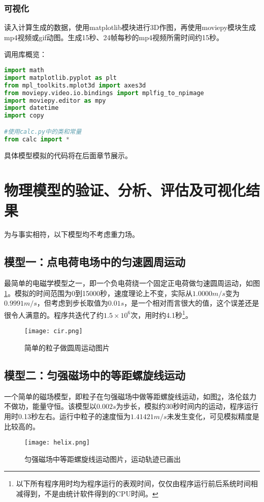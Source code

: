 \documentclass[UTF-8,cs4size]{ctexart}
\begin{document}
\subsubsection{可视化}
读入计算生成的数据，使用matplotlib模块进行3D作图，再使用moviepy模块生成mp4视频或gif动图。生成15秒、24帧每秒的mp4视频所需时间约15秒。


调用库概览：
\begin{lstlisting}[language=Python]
import math
import matplotlib.pyplot as plt
from mpl_toolkits.mplot3d import axes3d
from moviepy.video.io.bindings import mplfig_to_npimage
import moviepy.editor as mpy
import datetime
import copy

#使用calc.py中的类和常量
from calc import *
\end{lstlisting}


具体模型模拟的代码将在后面章节展示。
\section{物理模型的验证、分析、评估及可视化结果}
为与事实相符，以下模型均不考虑重力场。
\subsection{模型一：点电荷电场中的匀速圆周运动}
最简单的电磁学模型之一，即一个负电荷绕一个固定正电荷做匀速圆周运动，如图\ref{fig:cir}。模拟的时间范围为0到15000秒，速度理论上不变，实际从$1.0000m/s$变为$0.9991m/s$，但考虑到步长取值为$0.01s$，是一个相对而言很大的值，这个误差还是很令人满意的。程序共迭代了约$1.5\times10^6$次，用时约4.1秒\footnote{以下所有程序用时均为程序运行的表观时间，仅仅由程序运行前后系统时间相减得到，不是由统计软件得到的CPU时间。}。
\begin{figure}[ht!]
	\centering
	\texttt{[image: cir.png]}
	\caption{简单的粒子做圆周运动图片}
	\label{fig:cir}
\end{figure}
\subsection{模型二：匀强磁场中的等距螺旋线运动}
一个简单的磁场模型，即粒子在匀强磁场中做等距螺旋线运动，如图\ref{fig:helix}，洛伦兹力不做功，能量守恒。该模型以$0.002s$为步长，模拟约30秒时间内的运动，程序运行用时0.13秒左右。运行中粒子的速度恒为$1.41421m/s$未发生变化，可见模拟精度是比较高的。
\begin{figure}[ht!]
	\centering
	\texttt{[image: helix.png]}
	\caption{匀强磁场中等距螺旋线运动图片，运动轨迹已画出}
	\label{fig:helix}
\end{figure}
\end{document}
